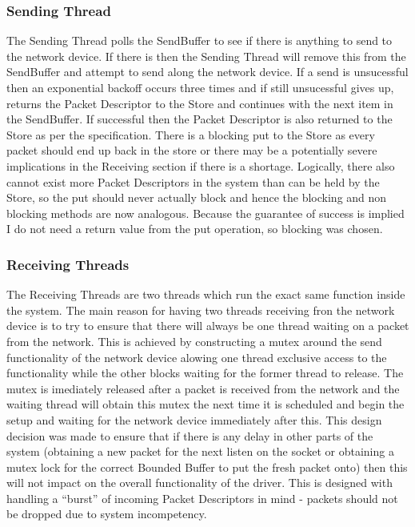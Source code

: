 \documentclass{article}
\begin{document}
\subsubsection*{Sending Thread}
The Sending Thread polls the SendBuffer to see if there is anything to
send to the network device. If there is then the Sending Thread will
remove this from the SendBuffer and attempt to send along the network
device. If a send is unsucessful then an exponential backoff occurs
three times and if still unsucessful gives up, returns the Packet
Descriptor to the Store and continues with the next item in the
SendBuffer. If successful then the Packet Descriptor is also returned
to the Store as per the specification. There is a blocking put to the
Store as every packet should end up back in the store or there may be
a potentially severe implications in the Receiving section if there is
a shortage. Logically, there also cannot exist more Packet Descriptors
in the system than can be held by the Store, so the put should never
actually block and hence the blocking and non blocking methods
are now analogous. Because the guarantee of success is implied I do
not need a return value from the put operation, so blocking was chosen.
\subsubsection*{Receiving Threads}
The Receiving Threads are two threads which run the exact same
function inside the system. The main reason for having two threads
receiving fron the network device is to try to ensure that there will
always be one thread waiting on a packet from the network. This is
achieved by constructing a mutex around the send functionality of the
network device alowing one thread exclusive access to the
functionality while the other blocks waiting for the former thread to
release. The mutex is imediately released after a packet is received
from the network and the waiting thread will obtain this mutex the
next time it is scheduled and begin the setup and waiting for the
network device immediately after this. This design decision was made
to ensure that if there is any delay in other parts of the system
(obtaining a new packet for the next listen on the socket or obtaining
a mutex lock for the correct Bounded Buffer to put the fresh packet
onto) then this will not impact on the overall functionality of the
driver. This is designed with handling a ``burst'' of incoming Packet
Descriptors in mind - packets should not be dropped due to system
incompetency. 
\end{document}
